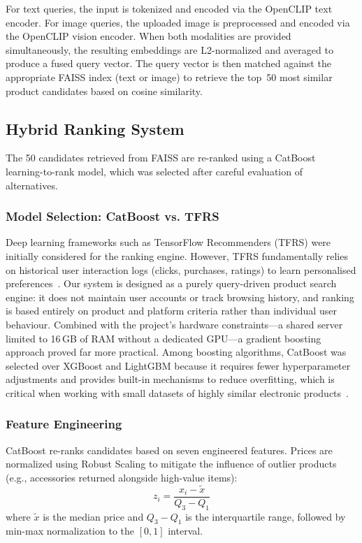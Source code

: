 \documentclass[conference]{IEEEtran}
\begin{document}
For text queries, the input is tokenized and encoded via the OpenCLIP text encoder. For image queries, the uploaded image is preprocessed and encoded via the OpenCLIP vision encoder. When both modalities are provided simultaneously, the resulting embeddings are L2-normalized and averaged to produce a fused query vector. The query vector is then matched against the appropriate FAISS index (text or image) to retrieve the top~50 most similar product candidates based on cosine similarity.

\subsection{Hybrid Ranking System}

The 50 candidates retrieved from FAISS are re-ranked using a CatBoost~\cite{catboost} learning-to-rank model, which was selected after careful evaluation of alternatives.

\subsubsection{Model Selection: CatBoost vs. TFRS}

Deep learning frameworks such as TensorFlow Recommenders (TFRS) were initially considered for the ranking engine. However, TFRS fundamentally relies on historical user interaction logs (clicks, purchases, ratings) to learn personalised preferences~\cite{paper1}. Our system is designed as a purely query-driven product search engine: it does not maintain user accounts or track browsing history, and ranking is based entirely on product and platform criteria rather than individual user behaviour. Combined with the project's hardware constraints---a shared server limited to 16\,GB of RAM without a dedicated GPU---a gradient boosting approach proved far more practical. Among boosting algorithms, CatBoost was selected over XGBoost and LightGBM because it requires fewer hyperparameter adjustments and provides built-in mechanisms to reduce overfitting, which is critical when working with small datasets of highly similar electronic products~\cite{catboost}.

\subsubsection{Feature Engineering}

CatBoost re-ranks candidates based on seven engineered features. Prices are normalized using Robust Scaling to mitigate the influence of outlier products (e.g., accessories returned alongside high-value items):
\begin{equation}
z_i = \frac{x_i - \tilde{x}}{Q_3 - Q_1}
\label{eq:robust}
\end{equation}
where $\tilde{x}$ is the median price and $Q_3 - Q_1$ is the interquartile range, followed by min-max normalization to the $[0, 1]$ interval.
\end{document}
